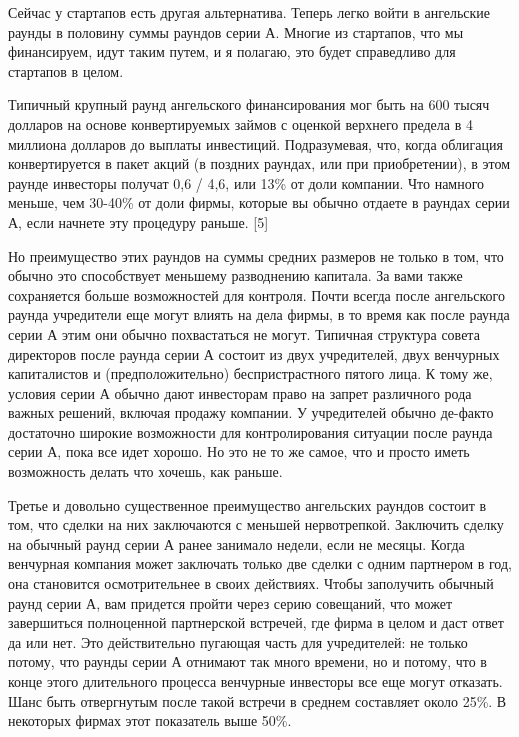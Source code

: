 \documentclass[ebook,12pt,oneside,openany]{memoir}
\begin{document}
Сейчас у стартапов есть другая альтернатива. Теперь легко войти в
ангельские раунды в половину суммы раундов серии А. Многие из
стартапов, что мы финансируем, идут таким путем, и я полагаю, это
будет справедливо для стартапов в целом.

Типичный крупный раунд ангельского финансирования мог быть на 600
тысяч долларов на основе конвертируемых займов с оценкой верхнего
предела в 4 миллиона долларов до выплаты инвестиций. Подразумевая,
что, когда облигация конвертируется в пакет акций (в поздних раундах,
или при приобретении), в этом раунде инвесторы получат 0,6 / 4,6, или
13\% от доли компании. Что намного меньше, чем 30-40\% от доли фирмы,
которые вы обычно отдаете в раундах серии А, если начнете эту
процедуру раньше. [5]

Но преимущество этих раундов на суммы средних размеров не только в
том, что обычно это способствует меньшему разводнению капитала. За
вами также сохраняется больше возможностей для контроля. Почти всегда
после ангельского раунда учредители еще могут влиять на дела фирмы, в
то время как после раунда серии А этим они обычно похвастаться не
могут. Типичная структура совета директоров после раунда серии А
состоит из двух учредителей, двух венчурных капиталистов и
(предположительно) беспристрастного пятого лица. К тому же, условия
серии А обычно дают инвесторам право на запрет различного рода важных
решений, включая продажу компании. У учредителей обычно де-факто
достаточно широкие возможности для контролирования ситуации после
раунда серии А, пока все идет хорошо. Но это не то же самое, что и
просто иметь возможность делать что хочешь, как раньше.

Третье и довольно существенное преимущество ангельских раундов состоит
в том, что сделки на них заключаются с меньшей нервотрепкой. Заключить
сделку на обычный раунд серии А ранее занимало недели, если не месяцы.
Когда венчурная компания может заключать только две сделки с одним
партнером в год, она становится осмотрительнее в своих действиях.
Чтобы заполучить обычный раунд серии А, вам придется пройти через
серию совещаний, что может завершиться полноценной партнерской
встречей, где фирма в целом и даст ответ да или нет. Это действительно
пугающая часть для учредителей: не только потому, что раунды серии А
отнимают так много времени, но и потому, что в конце этого длительного
процесса венчурные инвесторы все еще могут отказать. Шанс быть
отвергнутым после такой встречи в среднем составляет около 25\%. В
некоторых фирмах этот показатель выше 50\%.
\end{document}
